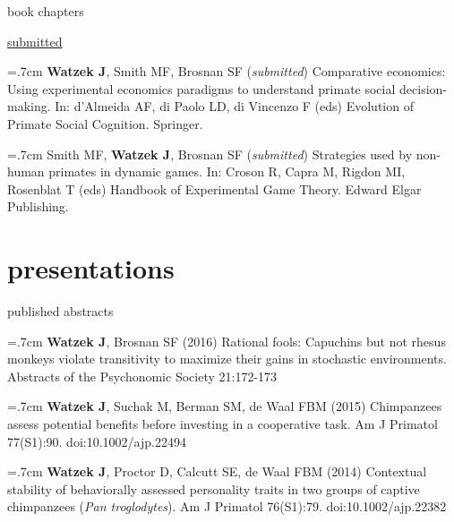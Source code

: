 \documentclass[]{friggeri-cv}
\begin{document}




{\subfont\large{} book chapters}


\hspace{.35cm} { \underline{submitted}} %

\hangindent=.7cm \textbf{Watzek J}, Smith MF, Brosnan SF (\emph{submitted}) Comparative economics: Using experimental economics paradigms to understand primate social decision-making. In: d'Almeida AF, di Paolo LD, di Vincenzo F (eds) Evolution of Primate Social Cognition. Springer.

\hangindent=.7cm Smith MF, \textbf{Watzek J}, Brosnan SF (\emph{submitted}) Strategies used by non-human primates in dynamic games. In: Croson R, Capra M, Rigdon MI, Rosenblat T (eds) Handbook of Experimental Game Theory. Edward Elgar Publishing. \\[-.1cm]


\section{presentations}


{\subfont\large{} published abstracts}

\hangindent=.7cm \textbf{Watzek J}, Brosnan SF (2016) Rational fools: Capuchins but not rhesus monkeys violate transitivity to maximize their gains in stochastic environments. Abstracts of the Psychonomic Society 21:172-173

\hangindent=.7cm \textbf{Watzek J}, Suchak M, Berman SM, de Waal FBM (2015) Chimpanzees assess potential benefits before investing in a cooperative task. Am J Primatol 77(S1):90. doi:10.1002/ajp.22494

\hangindent=.7cm \textbf{Watzek J}, Proctor D, Calcutt SE, de Waal FBM (2014) Contextual stability of behaviorally assessed personality traits in two groups of captive chimpanzees (\emph{Pan troglodytes}). Am J Primatol 76(S1):79. doi:10.1002/ajp.22382
\end{document}

